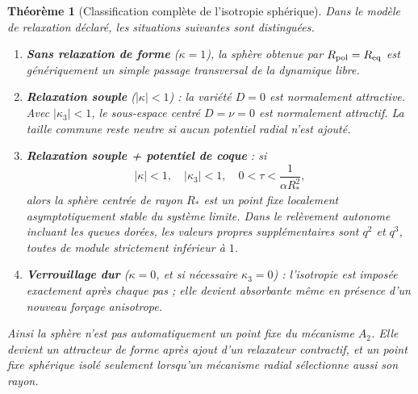 \documentclass[11pt,a4paper]{article}
\newtheorem{theorem}{Théorème}[section]
\begin{document}
\begin{theorem}[Classification complète de l'isotropie sphérique]\label{thm:v9-full-classification}
Dans le modèle de relaxation déclaré, les situations suivantes sont distinguées.
\begin{enumerate}[label=\textup{(\roman*)}]
\item \textbf{Sans relaxation de forme} ($\kappa=1$), la sphère obtenue par $R_{\rm pol}=R_{\rm eq}$ est génériquement un simple passage transversal de la dynamique libre.
\item \textbf{Relaxation souple} ($|\kappa|<1$) : la variété $D=0$ est normalement attractive. Avec $|\kappa_3|<1$, le sous-espace centré $D=\nu=0$ est normalement attractif. La taille commune reste neutre si aucun potentiel radial n'est ajouté.
\item \textbf{Relaxation souple + potentiel de coque} : si
\[
 |\kappa|<1,
 \quad |\kappa_3|<1,
 \quad 0<\tau<\frac1{\alpha R_*^2},
\]
alors la sphère centrée de rayon $R_*$ est un point fixe localement asymptotiquement stable du système limite. Dans le relèvement autonome incluant les queues dorées, les valeurs propres supplémentaires sont $q^2$ et $q^3$, toutes de module strictement inférieur à $1$.
\item \textbf{Verrouillage dur} ($\kappa=0$, et si nécessaire $\kappa_3=0$) : l'isotropie est imposée exactement après chaque pas ; elle devient absorbante même en présence d'un nouveau forçage anisotrope.
\end{enumerate}
Ainsi la sphère n'est pas automatiquement un point fixe du mécanisme $A_2$. Elle devient un attracteur de forme après ajout d'un relaxateur contractif, et un point fixe sphérique isolé seulement lorsqu'un mécanisme radial sélectionne aussi son rayon.
\end{theorem}
\end{document}

